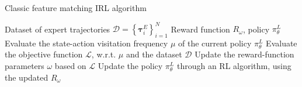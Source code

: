 \begin{algorithm}
\caption{Classic feature matching IRL algorithm}
\label{alg:irl}
\begin{algorithmic}
\Require Dataset of expert trajectories $\mathcal{D} = \left \{ \boldsymbol{\tau}^{E}_{i} \right \}^{N}_{i=1}$ 
\Require Reward function $R_{\omega}$, policy $\pi^{L}_{\theta}$ 
    \State Evaluate the state-action visitation frequency $\mu$ of the current policy $\pi^{L}_{\theta}$
    \State Evaluate the objective function $\mathcal{L}$, w.r.t. $\mu$ and the dataset $\mathcal{D}$
    \State Update the reward-function parameters $\omega$ based on $\mathcal{L}$
    \State Update the policy $\pi^{L}_{\theta}$ through an RL algorithm, using the updated $R_{\omega}$
\EndWhile
\end{algorithmic}
\end{algorithm}